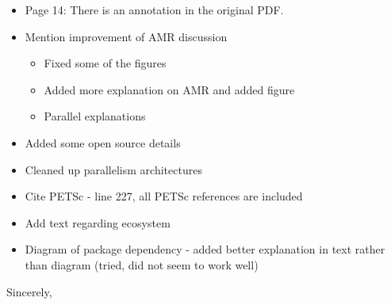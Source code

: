 \documentclass{letter}
\begin{document}
\begin{letter}
\begin{itemize}
    \item Page 14:  There is an annotation in the original PDF.

\end{itemize}


















\begin{itemize}
    \item Mention improvement of AMR discussion
    \begin{itemize}
        \item Fixed some of the figures
        \item Added more explanation on AMR and added figure
        \item Parallel explanations
    \end{itemize}
    \item Added some open source details
    \item Cleaned up parallelism architectures
    \item Cite PETSc - line 227, all PETSc references are included
    \item Add text regarding ecosystem
    \item Diagram of package dependency - added better explanation in text
    rather than diagram (tried, did not seem to work well)
\end{itemize}

\vspace{4cm}

\closing{Sincerely,}

\end{letter}
\end{document}
